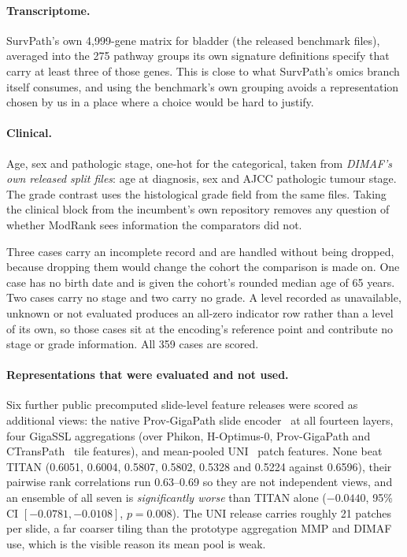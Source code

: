 \paragraph{Transcriptome.} SurvPath's own 4{,}999-gene matrix for bladder
(the released benchmark files), averaged into the 275 pathway
groups its own signature definitions specify that carry at least three of those genes.
This is close to what SurvPath's omics branch itself consumes, and using the benchmark's own
grouping avoids a representation chosen by us in a place where a choice would be hard to justify.

\paragraph{Clinical.} Age, sex and pathologic stage, one-hot for the categorical, taken from
\emph{DIMAF's own released split files}: age at diagnosis, sex and
AJCC pathologic tumour stage. The grade contrast uses the histological grade field from
the same files. Taking the clinical block from the incumbent's own repository removes any question
of whether ModRank sees information the comparators did not.

Three cases carry an incomplete record and are handled without being dropped, because dropping them
would change the cohort the comparison is made on. One case has no birth date and is given the
cohort's rounded median age of 65 years. Two cases carry no stage and two carry no grade. A level
recorded as unavailable, unknown or not evaluated produces an all-zero indicator row rather than a
level of its own, so those cases sit at the encoding's reference point and contribute no stage or
grade information. All 359 cases are scored.

\paragraph{Representations that were evaluated and not used.} Six further public precomputed
slide-level feature releases were scored as additional views: the native Prov-GigaPath slide
encoder~\citep{xu2024provgigapath} at all fourteen layers, four GigaSSL aggregations (over Phikon,
H-Optimus-0, Prov-GigaPath and CTransPath~\citep{wang2022ctranspath} tile features), and mean-pooled
UNI~\citep{chen2024uni} patch features. None beat TITAN (0.6051, 0.6004, 0.5807, 0.5802, 0.5328 and
0.5224 against 0.6596), their pairwise rank correlations run 0.63--0.69 so they are not independent
views, and an ensemble of all seven is \emph{significantly worse} than TITAN alone ($-0.0440$, 95\%
CI $[-0.0781,-0.0108]$, $p=0.008$). The UNI release carries roughly 21 patches per slide, a far
coarser tiling than the prototype aggregation MMP and DIMAF use, which is the visible reason its
mean pool is weak.

